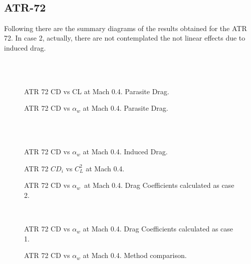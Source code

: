 \noindent \\

\subsection{ATR-72}

Following there are the summary diagrams of the results obtained for the ATR 72. In case 2, actually, there are not  contemplated the not linear effects due to induced drag.

\noindent \\ \\
\begin{figure}[H]
\centering

\caption{ATR 72 CD vs CL at Mach 0.4. Parasite Drag.}
\label{fig:DragATR}
\end{figure}

\begin{figure}[H]
\centering

\caption{ATR 72 CD vs $\alpha_w$ at Mach 0.4. Parasite Drag.}
\label{fig:DragATR}
\end{figure}
\noindent \\\\
\begin{figure}[H]
\centering

\caption{ATR 72 CD vs $\alpha_w$ at Mach 0.4. Induced Drag.}
\label{fig:DragATR}
\end{figure}

\begin{figure}[H]
\centering

\caption{ATR 72 $CD_i$ vs $C_L^2$  at Mach 0.4.}
\label{fig:DragATR}
\end{figure}

\begin{figure}[H]
\centering

\caption{ATR 72 CD vs $\alpha_w$\  at Mach 0.4. Drag Coefficients calculated as case 2.}
\label{fig:DragATR}
\end{figure}
\noindent \\
\begin{figure}[H]
\centering

\caption{ATR 72 CD vs $\alpha_w$  at Mach 0.4. Drag Coefficients calculated as case 1.}
\label{fig:DragATR}
\end{figure}

\begin{figure}[H]
\centering

\caption{ATR 72 CD vs $\alpha_w$  at Mach 0.4. Method comparison.}
\label{fig:DragATR}
\end{figure}

